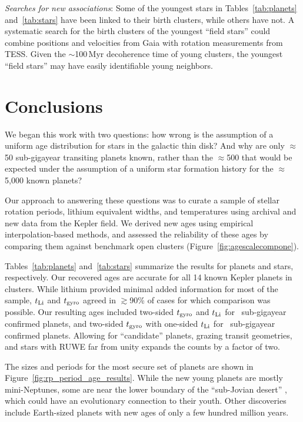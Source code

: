 \documentclass[11pt,twocolumn,tighten,linenumbers,trackchanges]{aastex63}
\begin{document}
{\it Searches for new associations}:
Some of the youngest stars in Tables~\ref{tab:planets}
and~\ref{tab:stars} have been linked to their birth clusters, while
others have not. A systematic search for the birth clusters of the
youngest ``field stars'' could combine positions and velocities from
Gaia with rotation measurements from TESS. Given the $\sim$100\,Myr
decoherence time of young clusters, the youngest ``field stars'' may
have easily identifiable young neighbors.



\section{Conclusions}
\label{sec:conclusions}

We began this work with two questions: how wrong is the assumption of
a uniform age distribution for stars in the galactic thin disk?  And
why are only $\approx$50 sub-gigayear transiting planets known, rather
than the $\approx$500 that would be expected under the assumption of a
uniform star formation history for the $\approx$5{,}000 known planets?

Our approach to answering these questions was to curate a sample of
stellar rotation periods, lithium equivalent widths, and temperatures
using archival and new data from the Kepler field.  We derived new
ages using empirical interpolation-based methods, and assessed the
reliability of these ages by comparing them against benchmark open
clusters (Figure~\ref{fig:agescalecompone}).

Tables~\ref{tab:planets} and~\ref{tab:stars} summarize the results for
planets and stars, respectively.  Our recovered ages are accurate for
all 14 known Kepler planets in clusters.  While lithium provided
minimal added information for most of the sample, $t_{\rm Li}$ and
$t_{\rm gyro}$ agreed in $\gtrsim$90\% of cases for which comparison
was possible.  Our resulting ages included two-sided $t_{\rm gyro}$
and $t_{\rm Li}$ for \ltonegyrhighqconfirmedtwosided\ sub-gigayear
confirmed planets, and two-sided $t_{\rm gyro}$ with one-sided $t_{\rm
Li}$ for \ltonegyrhighqconfirmedonesided\ sub-gigayear confirmed
planets.  Allowing for ``candidate'' planets, grazing transit
geometries, and stars with RUWE far from unity expands the counts by a
factor of two.

The sizes and periods for the most secure set of planets are shown in
Figure~\ref{fig:rp_period_age_results}.   While the new young planets
are mostly mini-Neptunes, some are near the lower boundary of the
``sub-Jovian desert'' \citep{Owen2018}, which could have an
evolutionary connection to their youth.  Other discoveries include
Earth-sized planets with new ages of only a few hundred million years.  
\end{document}
